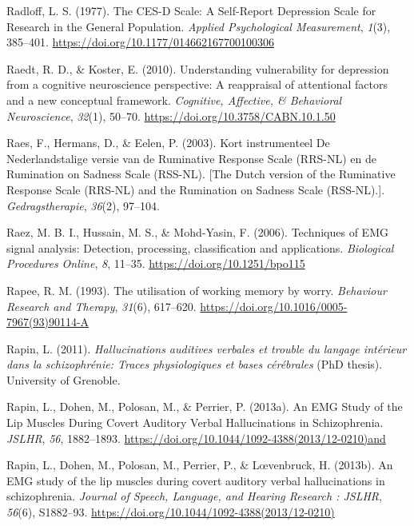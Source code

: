 \documentclass[a4paper,12pt,twoside,openright,oldfontcommands]{memoir}
\begin{document}
\leavevmode\hypertarget{ref-radloff_ces-d_1977}{}%
Radloff, L. S. (1977). The CES-D Scale: A Self-Report Depression Scale for Research in the General Population. \emph{Applied Psychological Measurement}, \emph{1}(3), 385--401. \url{https://doi.org/10.1177/014662167700100306}

\leavevmode\hypertarget{ref-Raedt2010}{}%
Raedt, R. D., \& Koster, E. (2010). Understanding vulnerability for depression from a cognitive neuroscience perspective: A reappraisal of attentional factors and a new conceptual framework. \emph{Cognitive, Affective, \& Behavioral Neuroscience}, \emph{32}(1), 50--70. \url{https://doi.org/10.3758/CABN.10.1.50}

\leavevmode\hypertarget{ref-raes_kort_2003}{}%
Raes, F., Hermans, D., \& Eelen, P. (2003). Kort instrumenteel De Nederlandstalige versie van de Ruminative Response Scale (RRS-NL) en de Rumination on Sadness Scale (RSS-NL). {[}The Dutch version of the Ruminative Response Scale (RRS-NL) and the Rumination on Sadness Scale (RSS-NL).{]}. \emph{Gedragstherapie}, \emph{36}(2), 97--104.

\leavevmode\hypertarget{ref-raez_techniques_2006}{}%
Raez, M. B. I., Hussain, M. S., \& Mohd-Yasin, F. (2006). Techniques of EMG signal analysis: Detection, processing, classification and applications. \emph{Biological Procedures Online}, \emph{8}, 11--35. \url{https://doi.org/10.1251/bpo115}

\leavevmode\hypertarget{ref-rapee_utilisation_1993}{}%
Rapee, R. M. (1993). The utilisation of working memory by worry. \emph{Behaviour Research and Therapy}, \emph{31}(6), 617--620. \url{https://doi.org/10.1016/0005-7967(93)90114-A}

\leavevmode\hypertarget{ref-Rapin2011}{}%
Rapin, L. (2011). \emph{Hallucinations auditives verbales et trouble du langage intérieur dans la schizophrénie: Traces physiologiques et bases cérébrales} (PhD thesis). University of Grenoble.

\leavevmode\hypertarget{ref-rapin_emg_2013}{}%
Rapin, L., Dohen, M., Polosan, M., \& Perrier, P. (2013a). An EMG Study of the Lip Muscles During Covert Auditory Verbal Hallucinations in Schizophrenia. \emph{JSLHR}, \emph{56}, 1882--1893. \url{https://doi.org/10.1044/1092-4388(2013/12-0210)and}

\leavevmode\hypertarget{ref-Rapin2013}{}%
Rapin, L., Dohen, M., Polosan, M., Perrier, P., \& Lœvenbruck, H. (2013b). An EMG study of the lip muscles during covert auditory verbal hallucinations in schizophrenia. \emph{Journal of Speech, Language, and Hearing Research : JSLHR}, \emph{56}(6), S1882--93. \url{https://doi.org/10.1044/1092-4388(2013/12-0210)}
\end{document}
